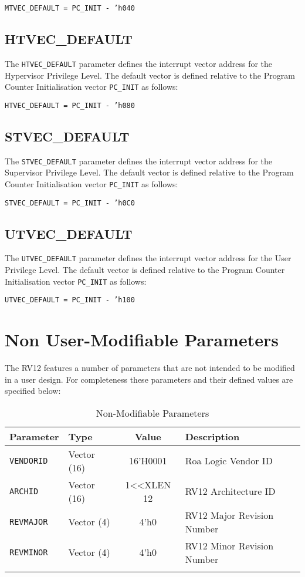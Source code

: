 \texttt{MTVEC\_DEFAULT = PC\_INIT - 'h040}

\subsection{HTVEC\_DEFAULT}\label{htvec_default}

The \texttt{HTVEC\_DEFAULT} parameter defines the interrupt vector address for
the Hypervisor Privilege Level. The default vector is defined relative
to the Program Counter Initialisation vector \texttt{PC\_INIT} as follows:

\texttt{HTVEC\_DEFAULT = PC\_INIT - 'h080}

\subsection{STVEC\_DEFAULT}\label{stvec_default}

The \texttt{STVEC\_DEFAULT} parameter defines the interrupt vector address for
the Supervisor Privilege Level. The default vector is defined relative
to the Program Counter Initialisation vector \texttt{PC\_INIT} as follows:

\texttt{STVEC\_DEFAULT = PC\_INIT - 'h0C0}

\subsection{UTVEC\_DEFAULT}\label{utvec_default}

The \texttt{UTVEC\_DEFAULT} parameter defines the interrupt vector address for
the User Privilege Level. The default vector is defined relative to the
Program Counter Initialisation vector \texttt{PC\_INIT} as follows:

\texttt{UTVEC\_DEFAULT = PC\_INIT - 'h100}

\section{Non User-Modifiable Parameters} \label{non-user-modifiable-parameters}

The RV12 features a number of parameters that are not intended to be
modified in a user design. For completeness these parameters and their
defined values are specified below:

\begin{longtable}[]{@{}llcl@{}}
\toprule
Parameter & Type & Value & Description\tabularnewline
\midrule
\endhead
\texttt{VENDORID} & Vector (16) & 16'H0001 & Roa Logic Vendor ID\tabularnewline
\texttt{ARCHID} & Vector (16) & 1\textless{}\textless{}XLEN \textbar{} 12 & RV12
Architecture ID\tabularnewline
\texttt{REVMAJOR} & Vector (4) & 4'h0 & RV12 Major Revision Number\tabularnewline
\texttt{REVMINOR} & Vector (4) & 4'h0 & RV12 Minor Revision Number\tabularnewline
\bottomrule
\caption{Non-Modifiable Parameters}
\label{tab:nonmod-parameters}
\end{longtable}